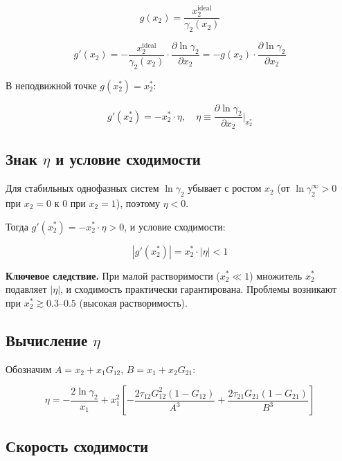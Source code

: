 \documentclass[11pt]{article}
\begin{document}
\begin{equation*}
g(x_2) = \frac{x_2^{\mathrm{ideal}}}{\gamma_2(x_2)}
\end{equation*}

\begin{equation*}
g'(x_2) = -\frac{x_2^{\mathrm{ideal}}}{\gamma_2(x_2)} \cdot \frac{\partial \ln \gamma_2}{\partial x_2} = -g(x_2) \cdot \frac{\partial \ln \gamma_2}{\partial x_2}
\end{equation*}

В неподвижной точке $g(x_2^{*}) = x_2^{*}$:

\begin{equation*}
\boxed{g'(x_2^{*}) = -x_2^{*} \cdot \eta, \quad \eta \equiv \frac{\partial \ln \gamma_2}{\partial x_2}\bigg|_{x_2^{*}}}
\end{equation*}

\subsection{Знак $\eta$ и условие сходимости}

Для стабильных однофазных систем $\ln \gamma_2$ убывает с ростом $x_2$ (от $\ln \gamma_2^\infty > 0$ при $x_2 = 0$ к $0$ при $x_2 = 1$), поэтому $\eta < 0$.

Тогда $g'(x_2^{*}) = -x_2^{*} \cdot \eta > 0$, и условие сходимости:

\begin{equation*}
|g'(x_2^{*})| = x_2^{*} \cdot |\eta| < 1
\end{equation*}

\textbf{Ключевое следствие.} При малой растворимости ($x_2^{*} \ll 1$) множитель $x_2^{*}$ подавляет $|\eta|$, и сходимость практически гарантирована. Проблемы возникают при $x_2^{*} \gtrsim 0.3$--$0.5$ (высокая растворимость).

\subsection{Вычисление $\eta$}

Обозначим $A = x_2 + x_1 G_{12}$, $B = x_1 + x_2 G_{21}$:

\begin{equation*}
\eta = -\frac{2 \ln \gamma_2}{x_1} + x_1^2 \left[-\frac{2\tau_{12}G_{12}^2(1 - G_{12})}{A^3} + \frac{2\tau_{21}G_{21}(1 - G_{21})}{B^3}\right]
\end{equation*}

\subsection{Скорость сходимости}
\end{document}
